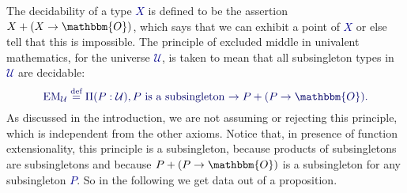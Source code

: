 \documentclass[10pt]{article}
\newcommand{\db}{\textcolor{darkblue}}
\newcommand{\m}[1]{\db{$#1$}}
\newcommand{\M}[1]{\[\db{#1}\]}
\newcommand{\EM}{\operatorname{EM}}
\newcommand{\U}{\mathcal{U}}
\newcommand{\Zero}{\mathbbm{O}}
\newcommand{\One}{\mathbbm{1}}
\newcommand{\eqdef}{\overset{\text{def}}{=}}
\theoremstyle{definition}
\begin{document}
The decidability of a type \m{X} is defined to be the assertion \m{X +
  (X \to \Zero)}, which says that we can exhibit a point of \m{X} or
else tell that this is impossible.
The principle of excluded middle in univalent mathematics, for the
universe \m{\U}, is taken to mean that all subsingleton types in
\m{\U} are decidable:
%
\M{
  \EM_\U \eqdef \Pi (P : \U), \text{\m{P} is a subsingleton \m{\to P + (P \to \Zero)}.}
}
%
As discussed in the introduction, we are not assuming or rejecting
this principle, which is independent from the other axioms. Notice
that, in presence of function extensionality, this principle is
a subsingleton, because products of subsingletons are subsingletons and
because \m{P + (P \to \Zero)} is a subsingleton for any
subsingleton \m{P}. So in the following we get data out of a proposition.
\end{document}
